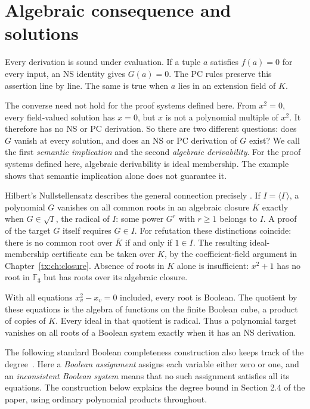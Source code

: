 \documentclass[11pt,a4paper,oneside,openany]{book}
\theoremstyle{definition}\newtheorem{definition}[theorem]{Definition}
\theoremstyle{remark}\newtheorem{remark}[theorem]{Remark}
\numberwithin{equation}{chapter}
\begin{document}
\section{Algebraic consequence and solutions}
Every derivation is sound under evaluation. If a tuple $a$ satisfies
$f(a)=0$ for every input, an NS identity gives $G(a)=0$. The PC rules
preserve this assertion line by line. The same is true when $a$ lies
in an extension field of $K$.

The converse need not hold for the proof systems defined here. From
$x^2=0$, every field-valued solution has $x=0$, but $x$ is not a
polynomial multiple of $x^2$. It therefore has no NS or PC derivation.
So there are two different questions: does $G$ vanish at every solution,
and does an NS or PC derivation of $G$ exist? We call the first
\emph{semantic implication} and the second \emph{algebraic derivability}.
For the proof systems defined here, algebraic derivability is ideal
membership. The example shows that semantic implication alone does not
guarantee it.

Hilbert's Nullstellensatz describes the general connection precisely
\cite{LangAlgebra}. If $I=\langle\Gamma\rangle$, a polynomial $G$
vanishes on all common roots in an algebraic closure $\overline K$
exactly when $G\in\sqrt I$, the radical of $I$: some power $G^r$
with $r\ge1$ belongs to $I$. A proof of the target $G$ itself requires
$G\in I$. For refutation these distinctions coincide: there is no
common root over $\overline K$ if and only if $1\in I$.
The resulting ideal-membership certificate can be taken over $K$,
by the coefficient-field argument in Chapter~\ref{tx:ch:closure}.
Absence of roots in $K$ alone is insufficient: $x^2+1$ has no root
in $\mathbb F_3$ but has roots over its algebraic closure.

With all equations $x_v^2-x_v=0$ included, every root is Boolean.
The quotient by these equations is the algebra of functions on the
finite Boolean cube, a product of copies of $K$. Every ideal in that
quotient is radical. Thus a polynomial target vanishes on all roots
of a Boolean system exactly when it has an NS derivation.

The following standard Boolean completeness construction also keeps
track of the degree~\cite{NSFoundations}. Here a
\emph{Boolean assignment} assigns each variable either zero or one, and
an \emph{inconsistent Boolean system} means that no such assignment
satisfies all its equations. The construction below explains the degree bound in Section 2.4
of the paper, using ordinary polynomial products throughout.
\end{document}

